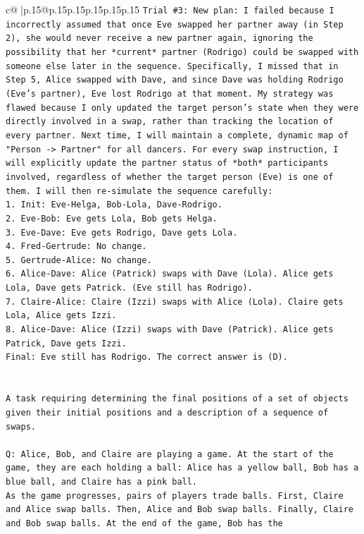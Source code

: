 \documentclass{article}
\begin{document}
{\begin{supertabular}{c@{$\;$}|p{.15\linewidth}@{}p{.15\linewidth}p{.15\linewidth}p{.15\linewidth}p{.15\linewidth}p{.15\linewidth}}
{{{\texttt{Trial \#3: New plan: I failed because I incorrectly assumed that once Eve swapped her partner away (in Step 2), she would never receive a new partner again, ignoring the possibility that her *current* partner (Rodrigo) could be swapped with someone else later in the sequence. Specifically, I missed that in Step 5, Alice swapped with Dave, and since Dave was holding Rodrigo (Eve's partner), Eve lost Rodrigo at that moment. My strategy was flawed because I only updated the target person's state when they were directly involved in a swap, rather than tracking the location of every partner. Next time, I will maintain a complete, dynamic map of "Person {-}> Partner" for all dancers. For every swap instruction, I will explicitly update the partner status of *both* participants involved, regardless of whether the target person (Eve) is one of them. I will then re{-}simulate the sequence carefully:} \\
\texttt{1. Init: Eve{-}Helga, Bob{-}Lola, Dave{-}Rodrigo.} \\
\texttt{2. Eve{-}Bob: Eve gets Lola, Bob gets Helga.} \\
\texttt{3. Eve{-}Dave: Eve gets Rodrigo, Dave gets Lola.} \\
\texttt{4. Fred{-}Gertrude: No change.} \\
\texttt{5. Gertrude{-}Alice: No change.} \\
\texttt{6. Alice{-}Dave: Alice (Patrick) swaps with Dave (Lola). Alice gets Lola, Dave gets Patrick. (Eve still has Rodrigo).} \\
\texttt{7. Claire{-}Alice: Claire (Izzi) swaps with Alice (Lola). Claire gets Lola, Alice gets Izzi.} \\
\texttt{8. Alice{-}Dave: Alice (Izzi) swaps with Dave (Patrick). Alice gets Patrick, Dave gets Izzi.} \\
\texttt{Final: Eve still has Rodrigo. The correct answer is (D).} \\
\\ 
\\ 
\texttt{A task requiring determining the final positions of a set of objects given their initial positions and a description of a sequence of swaps.} \\
\\ 
\texttt{Q: Alice, Bob, and Claire are playing a game. At the start of the game, they are each holding a ball: Alice has a yellow ball, Bob has a blue ball, and Claire has a pink ball.} \\
\texttt{As the game progresses, pairs of players trade balls. First, Claire and Alice swap balls. Then, Alice and Bob swap balls. Finally, Claire and Bob swap balls. At the end of the game, Bob has the} \\
}}}
\end{supertabular}}
\end{document}
